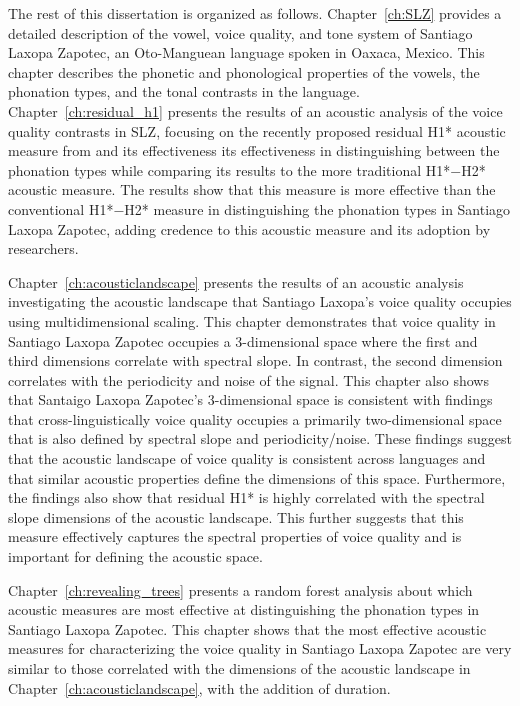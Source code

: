 The rest of this dissertation is organized as follows. Chapter~\ref{ch:SLZ} provides a detailed description of the vowel, voice quality, and tone system of Santiago Laxopa Zapotec, an Oto-Manguean language spoken in Oaxaca, Mexico. This chapter describes the phonetic and phonological properties of the vowels, the phonation types, and the tonal contrasts in the language. Chapter~\ref{ch:residual_h1} presents the results of an acoustic analysis of the voice quality contrasts in SLZ, focusing on the recently proposed residual H1* acoustic measure from \citet{chaiH1H2AcousticMeasure2022} and its effectiveness its effectiveness in distinguishing between the phonation types while comparing its results to the more traditional H1*$-$H2* acoustic measure. The results show that this measure is more effective than the conventional H1*$-$H2* measure in distinguishing the phonation types in Santiago Laxopa Zapotec, adding credence to this acoustic measure and its adoption by researchers. 

Chapter~\ref{ch:acousticlandscape} presents the results of an acoustic analysis investigating the acoustic landscape that Santiago Laxopa's voice quality occupies using multidimensional scaling. This chapter demonstrates that voice quality in Santiago Laxopa Zapotec occupies a 3-dimensional space where the first and third dimensions correlate with spectral slope. In contrast, the second dimension correlates with the periodicity and noise of the signal. This chapter also shows that Santaigo Laxopa Zapotec's 3-dimensional space is consistent with  findings that cross-linguistically voice quality occupies a primarily two-dimensional space that is also defined by spectral slope and periodicity/noise. These findings suggest that the acoustic landscape of voice quality is consistent across languages and that similar acoustic properties define the dimensions of this space. Furthermore, the findings also show that residual H1* is highly correlated with the spectral slope dimensions of the acoustic landscape. This further suggests that this measure effectively captures the spectral properties of voice quality and is important for defining the acoustic space.

Chapter~\ref{ch:revealing_trees} presents a random forest analysis about which acoustic measures are most effective at distinguishing the phonation types in Santiago Laxopa Zapotec. This chapter shows that the most effective acoustic measures for characterizing the voice quality in Santiago Laxopa Zapotec are very similar to those correlated with the dimensions of the acoustic landscape in Chapter~\ref{ch:acousticlandscape}, with the addition of duration. 

